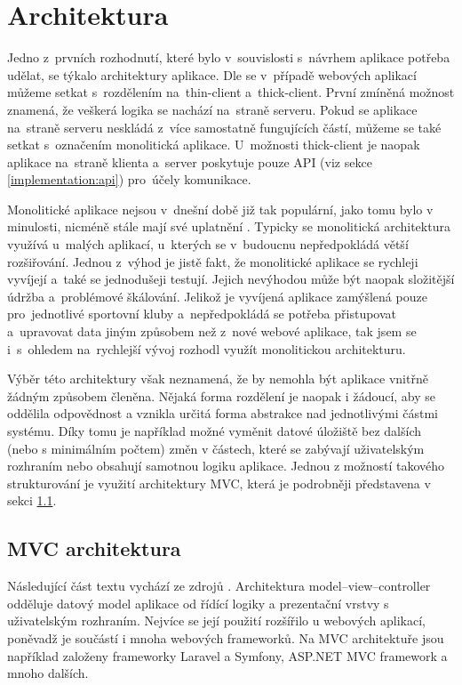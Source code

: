 \section{Architektura}
Jedno z~prvních rozhodnutí, které bylo v~souvislosti s~návrhem aplikace potřeba udělat, se týkalo architektury aplikace. Dle \cite{twa_architecture} se v~případě webových aplikací můžeme setkat s~rozdělením na~thin-client a~thick-client. První zmíněná možnost znamená, že veškerá logika se nachází na~straně serveru. Pokud se aplikace na~straně serveru neskládá z~více samostatně fungujících částí, můžeme se také setkat s~označením monolitická aplikace. U~možnosti thick-client je naopak aplikace na~straně klienta a~server poskytuje pouze API (viz sekce \ref{implementation:api}) pro~účely komunikace.

Monolitické aplikace nejsou v~dnešní době již tak populární, jako tomu bylo v minulosti, nicméně stále mají své uplatnění \cite{monolithic_vs_microservice}. Typicky se monolitická architektura využívá u~malých aplikací, u~kterých se v~budoucnu nepředpokládá větší rozšiřování. Jednou z~výhod je jistě fakt, že monolitické aplikace se rychleji vyvíjejí a~také se jednodušeji testují. Jejich nevýhodou může být naopak složitější údržba a~problémové škálování. \cite{twa_architecture, monolithic_vs_microservice} Jelikož je vyvíjená aplikace zamýšlená pouze pro~jednotlivé sportovní kluby a~nepředpokládá se potřeba přistupovat a~upravovat data jiným způsobem než z~nové webové aplikace, tak jsem se i~s~ohledem na~rychlejší vývoj rozhodl využít monolitickou architekturu.

Výběr této architektury však neznamená, že by nemohla být aplikace vnitřně žádným způsobem členěna. Nějaká forma rozdělení je naopak i žádoucí, aby se oddělila odpovědnost a vznikla určitá forma abstrakce nad jednotlivými částmi systému. Díky tomu je například možné vyměnit datové úložiště bez dalších (nebo s minimálním počtem) změn v částech, které se zabývají uživatelským rozhraním nebo obsahují samotnou logiku aplikace. Jednou z možností takového strukturování je využití architektury MVC, která je podrobněji představena v sekci \ref{section:mvc}.

\subsection{MVC architektura}\label{section:mvc}
Následující část textu vychází ze zdrojů \cite{it_network_mvc, mdn_mvc}. Architektura model–view–controller odděluje datový model aplikace od řídící logiky a prezentační vrstvy s uživatelským rozhraním. Nejvíce se její použití rozšířilo u webových aplikací, poněvadž je součástí i mnoha webových frameworků. Na MVC architektuře jsou například založeny frameworky Laravel a Symfony, ASP.NET MVC framework a mnoho dalších.

